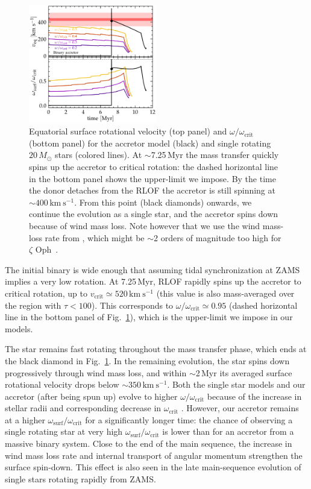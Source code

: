 \documentclass[twocolumn,twocolappendix,trackchanges]{aastex63}
\newcommand{\kms}{{\mathrm{km\ s^{-1}}}}
\DeclareRobustCommand{\Figref}[1]{Fig.~\ref{#1}}
\newcommand{\zoph}{$\zeta$ Oph}
\begin{document}
\begin{figure}[tbp]
  \includegraphics[width=0.5\textwidth]{zeta_rot}
  \caption{Equatorial surface rotational velocity (top panel) and
    $\omega/\omega_\mathrm{crit}$ (bottom panel) for the accretor model (black) and single rotating
    $20\,M_\odot$ stars (colored lines). At
    $\sim$7.25\,Myr the mass transfer quickly spins up the accretor to critical rotation: the dashed horizontal line in the bottom panel shows the upper-limit we impose. By the time the donor detaches from the RLOF the accretor is still spinning at
    $\sim$$400\,\kms$. From this point (black diamonds) onwards, we
    continue the evolution as a single star, and the accretor spins
    down because of wind mass loss.  Note however that we use the wind
    mass-loss rate from \cite{vink:01}, which might be $\sim$2 orders
    of magnitude too high for \zoph\ \citep{marcolino:09}.}
  \label{fig:surf_rot}
\end{figure}



The initial binary is wide enough that assuming tidal synchronization
at ZAMS implies a very low rotation. At 7.25\,Myr, RLOF rapidly spins
up the accretor to critical rotation, up to
$v_\mathrm{crit}\simeq520\,\kms$ (this value is also mass-averaged
over the region with $\tau<100$). This corresponds to
$\omega/\omega_\mathrm{crit}\simeq 0.95$ (dashed horizontal line in
the bottom panel of \Figref{fig:surf_rot}), which is the upper-limit
we impose in our models.

The star remains fast rotating throughout the mass transfer phase,
which ends at the black diamond in \Figref{fig:surf_rot}. In the
remaining evolution, the star spins down progressively through wind
mass loss, and within $\sim$2\,Myr its averaged surface rotational
velocity drops below
$\sim$$350\,\kms$. Both the single star models and our accretor (after being spun up) evolve to higher
$\omega/\omega_\mathrm{crit}$ because of the increase in stellar radii and corresponding decrease in
$\omega_\mathrm{crit}$ \citep[e.g.,][]{langer:98, zhao:20}. However, our accretor remains at a higher
$\omega_\mathrm{surf}/\omega_\mathrm{crit}$ for a significantly longer time: the chance of observing a single rotating star at very high
$\omega_\mathrm{surf}/\omega_\mathrm{crit}$ is lower than for an accretor from a massive binary system. Close to the end of the main sequence, the increase in wind mass loss rate and internal transport of angular momentum strengthen the surface spin-down. This effect is also seen in the late main-sequence evolution of single stars rotating rapidly from ZAMS.
\end{document}
